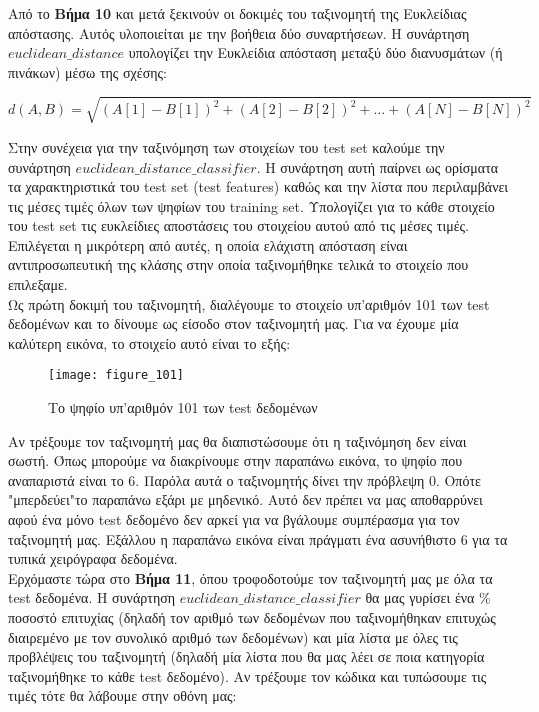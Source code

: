 \documentclass[11pt]{article} %
\begin{document}
Από το \textbf{Βήμα 10} και μετά ξεκινούν οι δοκιμές του ταξινομητή της Ευκλείδιας απόστασης. Αυτός υλοποιείται με την βοήθεια δύο συναρτήσεων. Η συνάρτηση $euclidean\_distance$ υπολογίζει την Ευκλείδια απόσταση μεταξύ δύο διανυσμάτων (ή πινάκων) μέσω της σχέσης:

\begin{equation}
\displaystyle d(A, B) = \sqrt{(A[1] -B[1]) ^ 2 + (A[2] - B[2]) ^ 2 + \dots + (A[N] - B[N]) ^ 2}
\end{equation}

Στην συνέχεια για την ταξινόμηση των στοιχείων του test set καλούμε την συνάρτηση $euclidean\_distance\_classifier$. Η συνάρτηση αυτή παίρνει ως ορίσματα τα χαρακτηριστικά του test set (test features) καθώς και την λίστα που περιλαμβάνει τις μέσες τιμές όλων των ψηφίων του training set. Υπολογίζει για το κάθε στοιχείο του test set τις ευκλείδιες αποστάσεις του στοιχείου αυτού από τις μέσες τιμές. Επιλέγεται η μικρότερη από αυτές, η οποία ελάχιστη απόσταση είναι αντιπροσωπευτική της κλάσης στην οποία ταξινομήθηκε τελικά το στοιχείο που επιλεξαμε.\\

Ως πρώτη δοκιμή του ταξινομητή, διαλέγουμε το στοιχείο υπ'αριθμόν 101 των test δεδομένων και το δίνουμε ως είσοδο στον ταξινομητή μας. Για να έχουμε μία καλύτερη εικόνα, το στοιχείο αυτό είναι το εξής:


\begin{figure}[H]
    \centering
    \texttt{[image: figure\_101]}
    \caption{Το ψηφίο υπ'αριθμόν 101 των test δεδομένων}
    \label{fig:101}
\end{figure}

Αν τρέξουμε τον ταξινομητή μας θα διαπιστώσουμε ότι η ταξινόμηση δεν είναι σωστή. Όπως μπορούμε να διακρίνουμε στην παραπάνω εικόνα, το ψηφίο που αναπαριστά είναι το $6$. Παρόλα αυτά ο ταξινομητής δίνει την πρόβλεψη $0$. Οπότε "μπερδεύει"το παραπάνω εξάρι με μηδενικό. Αυτό δεν πρέπει να μας αποθαρρύνει αφού ένα μόνο test δεδομένο δεν αρκεί για να βγάλουμε συμπέρασμα για τον ταξινομητή μας. Εξάλλου η παραπάνω εικόνα είναι πράγματι ένα ασυνήθιστο $6$ για τα τυπικά χειρόγραφα δεδομένα.\\

Ερχόμαστε τώρα στο \textbf{Βήμα 11}, όπου τροφοδοτούμε τον ταξινομητή μας με όλα τα test δεδομένα. Η συνάρτηση $euclidean\_distance\_classifier$ θα μας γυρίσει ένα \% ποσοστό επιτυχίας (δηλαδή τον αριθμό των δεδομένων που ταξινομήθηκαν επιτυχώς διαιρεμένο με τον συνολικό αριθμό των δεδομένων) και μία λίστα με όλες τις προβλέψεις του ταξινομητή (δηλαδή μία λίστα που θα μας λέει σε ποια κατηγορία ταξινομήθηκε το κάθε test δεδομένο). Αν τρέξουμε τον κώδικα και τυπώσουμε τις τιμές τότε θα λάβουμε στην οθόνη μας:
\end{document}
